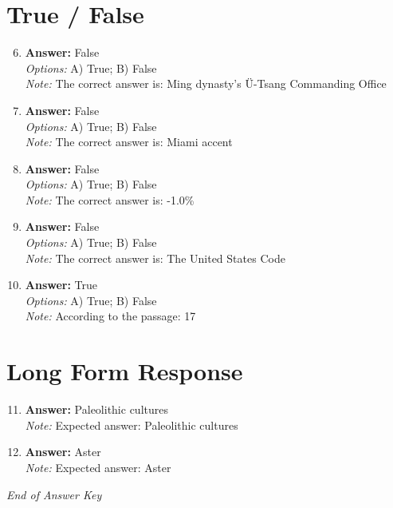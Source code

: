 \documentclass[12pt]{article}
\begin{document}
\section*{True / False}
\begin{enumerate}[label=\arabic*.]
\setcounter{enumi}{5}
\item \textbf{Answer:} False
\\ \textit{Options:} A) True; B) False
\\ \textit{Note:} The correct answer is: Ming dynasty's Ü-Tsang Commanding Office
\item \textbf{Answer:} False
\\ \textit{Options:} A) True; B) False
\\ \textit{Note:} The correct answer is: Miami accent
\item \textbf{Answer:} False
\\ \textit{Options:} A) True; B) False
\\ \textit{Note:} The correct answer is: -1.0\%
\item \textbf{Answer:} False
\\ \textit{Options:} A) True; B) False
\\ \textit{Note:} The correct answer is: The United States Code
\item \textbf{Answer:} True
\\ \textit{Options:} A) True; B) False
\\ \textit{Note:} According to the passage: 17
\end{enumerate}

\section*{Long Form Response}
\begin{enumerate}[label=\arabic*.]
\setcounter{enumi}{10}
\item \textbf{Answer:} Paleolithic cultures
\\ \textit{Note:} Expected answer: Paleolithic cultures
\item \textbf{Answer:} Aster
\\ \textit{Note:} Expected answer: Aster
\end{enumerate}

\vfill
\noindent\textit{End of Answer Key}
\end{document}
